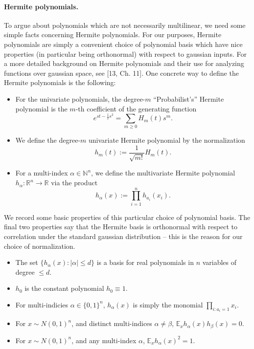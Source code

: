 \paragraph{Hermite polynomials.} To argue about polynomials which are not necessarily multilinear, we need some simple facts concerning Hermite polynomials. For our purposes, Hermite polynomials are simply a convenient choice of polynomial basis which have nice properties (in particular being orthonormal) with respect to gaussian inputs. For a more detailed background on Hermite polynomials and their use for analyzing functions over gaussian space, see [13, Ch. 11].
One concrete way to define the Hermite polynomials is the following:
\begin{itemize}
\item For the univariate polynomials, the degree-$m$ ``Probabilist's'' Hermite polynomial is the $m$-th coefficient of the generating function
\[e^{st-\frac12s^2}=\sum_{m\geq0}H_m(t)s^m.\]
\item We define the degree-$m$ univariate Hermite polynomial by the normalization
\[h_m(t):=\frac1{\sqrt{m!}}H_m(t).\]
\item For a multi-index $\alpha\in\mathbb N^n$, we define the multivariate Hermite polynomial $h_\alpha:\mathbb R^n\to\mathbb R$ via the product
\[h_\alpha(x):=\prod_{i=1}^nh_{a_i}(x_i).\]
\end{itemize}
We record some basic properties of this particular choice of polynomial basis. The final two properties say that the Hermite basis is orthonormal with respect to correlation under the standard gaussian distribution -- this is the reason for our choice of normalization.
\begin{itemize}
\item The set $\{h_\alpha(x):|\alpha|\leq d\}$ is a basis for real polynomials in $n$ variables of degree $\leq d$.
\item $h_0$ is the constant polynomial $h_0\equiv1$.
\item For multi-indicies $\alpha\in\{0,1\}^n$, $h_\alpha(x)$ is simply the monomial $\prod_{i:a_i=1}x_i$.
\item For $x\sim N(0,1)^n$, and distinct multi-indices $\alpha\neq\beta$, $\mathbb E_xh_\alpha(x)h_\beta(x)=0$.
\item For $x\sim N(0,1)^n$, and any multi-index $\alpha$, $\mathbb E_xh_\alpha(x)^2=1$.
\end{itemize}
